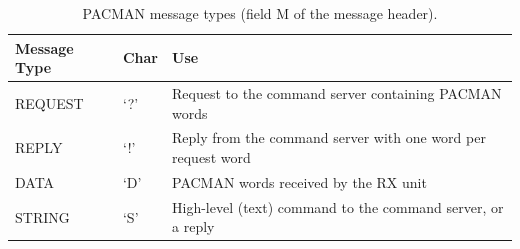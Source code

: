 \documentclass[12pt]{article}
\begin{document}
\begin{table}[htbp]
\centering\small
\begin{tabular}{|ll|p{11cm}|}
\hline
Message Type & Char & Use \\
\hline
REQUEST & `?' & Request to the command server containing PACMAN words \\
REPLY   & `!' & Reply from the command server with one word per request word \\
DATA    & `D' & PACMAN words received by the RX unit \\
STRING  & `S' & High-level (text) command to the command server, or a reply\\
\hline
\end{tabular}
\caption{PACMAN message types (field M of the message header).}
\label{tbl:pacman_msg_types}
\end{table}

\newcommand{\pacmanWordRect}[1]{%
  \def\wh{1}   %
  \def\ww{16}   %
  \def\bw{\ww/24} %

  \draw[line width = 2pt] (0,#1) rectangle (\ww, {#1+\wh});

  \foreach \i in {1,...,23} {
    \draw[dashed] ({\i*\bw}, #1) -- ({\i*\bw}, {#1+\wh});
  }
}

\newcommand{\pacmanFieldLow}[2]{%
  \def\wh{1}      %
  \def\ww{16}     %
  \def\bw{\ww/24} %

  \draw[line width = 2pt] ({#2*\bw}, {#1}) -- ({#2*\bw}, {#1+\wh});
}

\newcommand{\pacmanByteText}[3]{%
  \def\wh{1}   %
  \def\ww{16}  %
  \def\bw{\ww/24} %

  \pgfmathsetmacro{\xcenter}{#2*\bw + 0.5*\bw}
  \pgfmathsetmacro{\ycenter}{#1 + 0.5*\wh}

  \node at (\xcenter,\ycenter) {#3};
}
\end{document}

